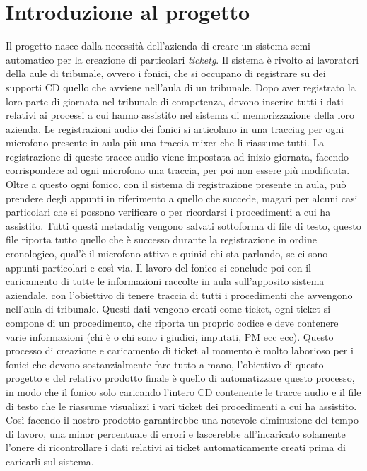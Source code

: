 \section{Introduzione al progetto}
Il progetto nasce dalla necessità dell'azienda di creare un sistema semi-automatico per la creazione di particolari \emph{\gls{ticketg}}\glsfirstoccur. Il sistema è rivolto ai lavoratori della aule di tribunale,
ovvero i fonici, che si occupano di registrare su dei supporti CD quello che avviene nell'aula di un tribunale. Dopo aver registrato la loro parte di giornata nel tribunale di competenza,
devono inserire tutti i dati relativi ai processi a cui hanno assistito nel sistema di memorizzazione della loro azienda. Le registrazioni audio dei fonici si articolano in una \gls{tracciag} per ogni microfono presente in aula
più una traccia mixer che li riassume tutti. La registrazione di queste tracce audio viene impostata ad inizio giornata, facendo corrispondere ad ogni microfono una traccia, per poi non essere più modificata.
Oltre a questo ogni fonico, con il sistema di registrazione presente in aula, può prendere degli appunti in riferimento a quello che succede, magari per alcuni casi particolari che si possono verificare o per ricordarsi i procedimenti a cui ha assistito.
Tutti questi \gls{metadatig} vengono salvati sottoforma di file di testo, questo file riporta tutto quello che è successo durante la registrazione in ordine cronologico, qual'è il microfono attivo e quinid chi sta parlando, se ci sono appunti particolari e così via.
Il lavoro del fonico si conclude poi con il caricamento di tutte le informazioni raccolte in aula sull'apposito sistema aziendale, con l'obiettivo di tenere traccia di tutti i procedimenti che avvengono nell'aula di tribunale.
Questi dati vengono creati come ticket, ogni ticket si compone di un procedimento, che riporta un proprio codice e deve contenere varie informazioni (chi è o chi sono i giudici, imputati, PM ecc ecc).
Questo processo di creazione e caricamento di ticket al momento è molto laborioso per i fonici che devono sostanzialmente fare tutto a mano, l'obiettivo di questo progetto e del relativo prodotto finale è quello di
automatizzare questo processo, in modo che il fonico solo caricando l'intero CD contenente le tracce audio e il file di testo che le riassume visualizzi i vari ticket dei procedimenti a cui ha assistito. Così facendo il nostro prodotto
garantirebbe una notevole diminuzione del tempo di lavoro, una minor percentuale di errori e lascerebbe all'incaricato solamente l'onere di ricontrollare i dati relativi ai ticket automaticamente creati prima di caricarli sul sistema.

